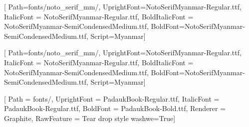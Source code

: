[
    Path=fonts/noto_serif_mm/,
    UprightFont=NotoSerifMyanmar-Regular.ttf,
    ItalicFont = NotoSerifMyanmar-Regular.ttf,
    BoldItalicFont = NotoSerifMyanmar-SemiCondensedMedium.ttf,
    BoldFont=NotoSerifMyanmar-SemiCondensedMedium.ttf, Script=Myanmar]
\DeclareTextFontCommand{\textnotoserifmm}{\notoserifmmfamily}

[
    Path=fonts/noto_serif_mm/,
    UprightFont=NotoSerifMyanmar-Regular.ttf,
    ItalicFont = NotoSerifMyanmar-Regular.ttf,
    BoldItalicFont = NotoSerifMyanmar-SemiCondensedMedium.ttf,
    BoldFont=NotoSerifMyanmar-SemiCondensedMedium.ttf, Script=Myanmar]
\DeclareTextFontCommand{\textnotoserifmmtoc}{\notoserifmmfamilytoc}




[
        Path = fonts/,
        UprightFont = PadaukBook-Regular.ttf,
        ItalicFont = PadaukBook-Regular.ttf,
        BoldFont = PadaukBook-Bold.ttf, Renderer = Graphite, RawFeature = {Tear drop style washwe=True}]
\DeclareTextFontCommand{\textpadaukbook}{\padaukbook}




